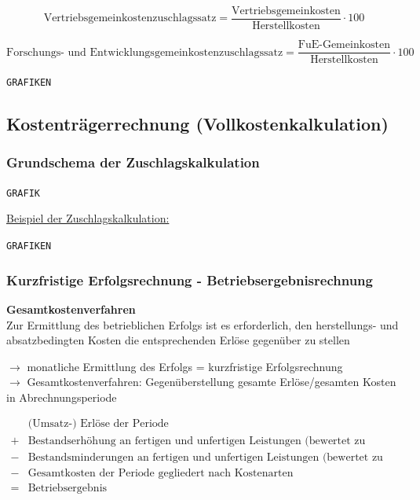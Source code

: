 \documentclass[a4paper,11pt, twoside]{article}
\begin{document}
\begin{equation}
\text{Vertriebsgemeinkostenzuschlagssatz} = \frac{\text{Vertriebsgemeinkosten}}{\text{Herstellkosten}} \cdot 100
\end{equation}

\begin{equation}
\text{Forschungs- und Entwicklungsgemeinkostenzuschlagssatz} = \frac{\text{FuE-Gemeinkosten}}{\text{Herstellkosten}} \cdot 100
\end{equation}

\texttt{GRAFIKEN}

\subsection{Kostenträgerrechnung (Vollkostenkalkulation)}

\subsubsection*{Grundschema der Zuschlagskalkulation}

\texttt{GRAFIK}

\underline{Beispiel der Zuschlagskalkulation:}

\texttt{GRAFIKEN}


\subsubsection*{Kurzfristige Erfolgsrechnung - Betriebsergebnisrechnung}

\textbf{Gesamtkostenverfahren}\\
Zur Ermittlung des betrieblichen Erfolgs ist es erforderlich, den herstellungs- und absatzbedingten Kosten die entsprechenden Erlöse gegenüber zu stellen

$\rightarrow$ monatliche Ermittlung des Erfolgs = kurzfristige Erfolgsrechnung\\
$\rightarrow$ Gesamtkostenverfahren: Gegenüberstellung gesamte Erlöse/gesamten Kosten in Abrechnungsperiode

\begin{equation}
\begin{aligned}
 & \text{(Umsatz-) Erlöse der Periode}\\
 + & \text{Bestandserhöhung an fertigen und unfertigen Leistungen (bewertet zu Herstellungskosten)}\\
 - & \text{Bestandsminderungen an fertigen und unfertigen Leistungen (bewertet zu Herstellungskosten)}\\
 - & \text{Gesamtkosten der Periode gegliedert nach Kostenarten}\\\hline
 = & \text{Betriebsergebnis}
 & \end{aligned}
\end{equation}
\end{document}
